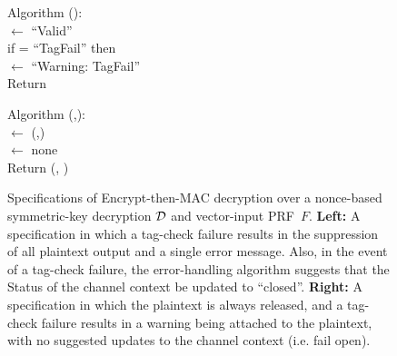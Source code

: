 \begin{figure}
{\medskip
Algorithm ():\\
\nudge {} $\gets$ ``Valid''\\
\nudge if  =  ``TagFail'' then\\ 
\nudge\nudge {} $\gets$ ``Warning: TagFail''\\
\nudge Return 

\medskip
Algorithm (,):\\
\nudge {} $\gets$ (,)\\
\nudge {} $\gets$ none \\
\nudge Return (, )
} 
\caption{Specifications of Encrypt-then-MAC decryption over a nonce-based
  symmetric-key decryption $\mathcal{D}$ and vector-input PRF~$F$.  {\bf
    Left:} A specification in which a tag-check failure results in the
suppression of all plaintext output and a single error message.  Also,
in the event of a tag-check failure, the error-handling algorithm
suggests that the Status of the channel context be updated to
``closed''. {\bf
  Right: } A specification in which the plaintext is always released,
and a tag-check failure results in a warning being attached to the
plaintext, with no suggested updates to the channel context
(i.e. fail open).}
\label{fig:EtM-aead}
\end{figure}

